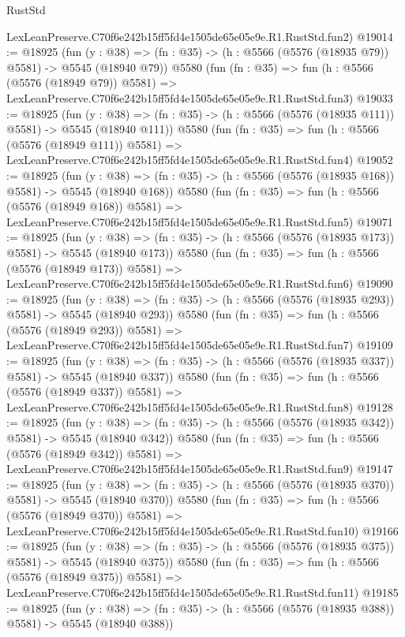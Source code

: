 \begin{lexlean}{RustStd}
\begin{coremodule}
    LexLeanPreserve.C70f6e242b15ff5fd4e1505de65e05e9e.R1.RustStd.fun2)
@19014 := @18925
    (fun (y : @38) => (fn : @35) -> (h : @5566 (@5576 (@18935 @79)) @5581) -> @5545 (@18940 @79))
    @5580
    (fun (fn : @35) =>
    fun (h : @5566 (@5576 (@18949 @79)) @5581) =>
    LexLeanPreserve.C70f6e242b15ff5fd4e1505de65e05e9e.R1.RustStd.fun3)
@19033 := @18925
    (fun (y : @38) => (fn : @35) -> (h : @5566 (@5576 (@18935 @111)) @5581) -> @5545 (@18940 @111))
    @5580
    (fun (fn : @35) =>
    fun (h : @5566 (@5576 (@18949 @111)) @5581) =>
    LexLeanPreserve.C70f6e242b15ff5fd4e1505de65e05e9e.R1.RustStd.fun4)
@19052 := @18925
    (fun (y : @38) => (fn : @35) -> (h : @5566 (@5576 (@18935 @168)) @5581) -> @5545 (@18940 @168))
    @5580
    (fun (fn : @35) =>
    fun (h : @5566 (@5576 (@18949 @168)) @5581) =>
    LexLeanPreserve.C70f6e242b15ff5fd4e1505de65e05e9e.R1.RustStd.fun5)
@19071 := @18925
    (fun (y : @38) => (fn : @35) -> (h : @5566 (@5576 (@18935 @173)) @5581) -> @5545 (@18940 @173))
    @5580
    (fun (fn : @35) =>
    fun (h : @5566 (@5576 (@18949 @173)) @5581) =>
    LexLeanPreserve.C70f6e242b15ff5fd4e1505de65e05e9e.R1.RustStd.fun6)
@19090 := @18925
    (fun (y : @38) => (fn : @35) -> (h : @5566 (@5576 (@18935 @293)) @5581) -> @5545 (@18940 @293))
    @5580
    (fun (fn : @35) =>
    fun (h : @5566 (@5576 (@18949 @293)) @5581) =>
    LexLeanPreserve.C70f6e242b15ff5fd4e1505de65e05e9e.R1.RustStd.fun7)
@19109 := @18925
    (fun (y : @38) => (fn : @35) -> (h : @5566 (@5576 (@18935 @337)) @5581) -> @5545 (@18940 @337))
    @5580
    (fun (fn : @35) =>
    fun (h : @5566 (@5576 (@18949 @337)) @5581) =>
    LexLeanPreserve.C70f6e242b15ff5fd4e1505de65e05e9e.R1.RustStd.fun8)
@19128 := @18925
    (fun (y : @38) => (fn : @35) -> (h : @5566 (@5576 (@18935 @342)) @5581) -> @5545 (@18940 @342))
    @5580
    (fun (fn : @35) =>
    fun (h : @5566 (@5576 (@18949 @342)) @5581) =>
    LexLeanPreserve.C70f6e242b15ff5fd4e1505de65e05e9e.R1.RustStd.fun9)
@19147 := @18925
    (fun (y : @38) => (fn : @35) -> (h : @5566 (@5576 (@18935 @370)) @5581) -> @5545 (@18940 @370))
    @5580
    (fun (fn : @35) =>
    fun (h : @5566 (@5576 (@18949 @370)) @5581) =>
    LexLeanPreserve.C70f6e242b15ff5fd4e1505de65e05e9e.R1.RustStd.fun10)
@19166 := @18925
    (fun (y : @38) => (fn : @35) -> (h : @5566 (@5576 (@18935 @375)) @5581) -> @5545 (@18940 @375))
    @5580
    (fun (fn : @35) =>
    fun (h : @5566 (@5576 (@18949 @375)) @5581) =>
    LexLeanPreserve.C70f6e242b15ff5fd4e1505de65e05e9e.R1.RustStd.fun11)
@19185 := @18925
    (fun (y : @38) => (fn : @35) -> (h : @5566 (@5576 (@18935 @388)) @5581) -> @5545 (@18940 @388))

\end{coremodule}
\end{lexlean}
